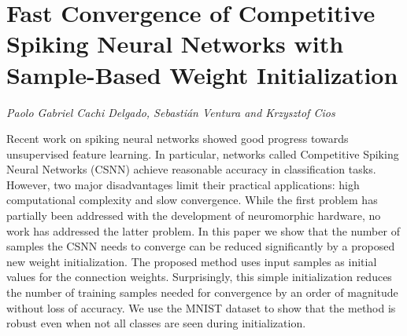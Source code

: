 \documentclass[../booklet.tex]{subfiles}
\begin{document}
\section[Fast Convergence of Competitive Spiking Neural Networks with Sample-Based Weight Initialization. {\it Paolo Gabriel Cachi Delgado, Sebastián Ventura and Krzysztof Cios}]{Fast Convergence of Competitive Spiking Neural Networks with Sample-Based Weight Initialization}
  

\begin{center}
  {\it Paolo Gabriel Cachi Delgado, Sebastián Ventura and Krzysztof Cios}
\end{center}

\vskip 0.8cm


Recent work on spiking neural networks showed good progress towards unsupervised feature learning. In particular, networks called Competitive Spiking Neural Networks (CSNN) achieve reasonable accuracy in classification tasks. However, two major disadvantages limit their practical applications: high computational complexity and slow convergence. While the first problem has partially been addressed with the development of neuromorphic hardware, no work has addressed the latter problem. In this paper we show that the number of samples the CSNN needs to converge can be reduced significantly by a proposed new weight initialization. The proposed method uses input samples as initial values for the connection weights. Surprisingly, this simple initialization reduces the number of training samples needed for convergence by an order of magnitude without loss of accuracy. We use the MNIST dataset to show that the method is robust even when not all classes are seen during initialization.

\end{document}
